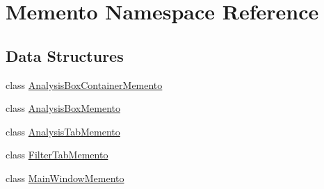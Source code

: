 \hypertarget{namespaceMemento}{}\section{Memento Namespace Reference}
\label{namespaceMemento}
\subsection*{Data Structures}
\begin{DoxyCompactItemize}
\item 
class \hyperlink{classMemento_1_1AnalysisBoxContainerMemento}{Analysis\+Box\+Container\+Memento}
\item 
class \hyperlink{classMemento_1_1AnalysisBoxMemento}{Analysis\+Box\+Memento}
\item 
class \hyperlink{classMemento_1_1AnalysisTabMemento}{Analysis\+Tab\+Memento}
\item 
class \hyperlink{classMemento_1_1FilterTabMemento}{Filter\+Tab\+Memento}
\item 
class \hyperlink{classMemento_1_1MainWindowMemento}{Main\+Window\+Memento}
\end{DoxyCompactItemize}
